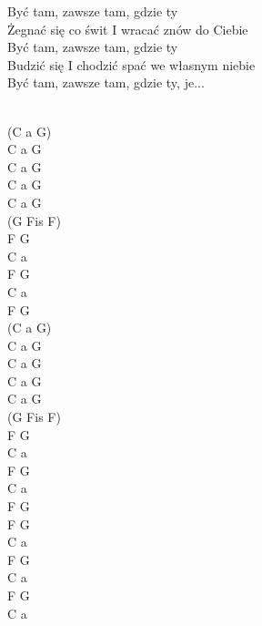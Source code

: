 \documentclass[a5paper, 10pt]{book}
\begin{document}
\begin{minipage}[t]{0.7\textwidth}
\hspace*{4mm}Być tam, zawsze tam, gdzie ty\\
\hspace*{4mm}Żegnać się co świt I wracać znów do Ciebie\\
\hspace*{4mm}Być tam, zawsze tam, gdzie ty\\
\hspace*{4mm}Budzić się I chodzić spać we własnym niebie\\
\hspace*{4mm}Być tam, zawsze tam, gdzie ty, je...\\
\\
\end{minipage}
\begin{minipage}[t]{0.3\textwidth}
(C a G)\\
C a G\\ 
C a G\\ 
C a G\\ 
C a G\\ 
(G Fis F)\\
F G\\
C a\\
F G\\
C a\\
F G\\
(C a G)\\
C a G\\ 
C a G\\ 
C a G\\ 
C a G\\ 
(G Fis F)\\
F G\\
C a\\
F G\\
C a\\
F G\\
F G\\
C a\\
F G\\
C a\\
F G\\
C a\\
\end{minipage}

\end{document}
